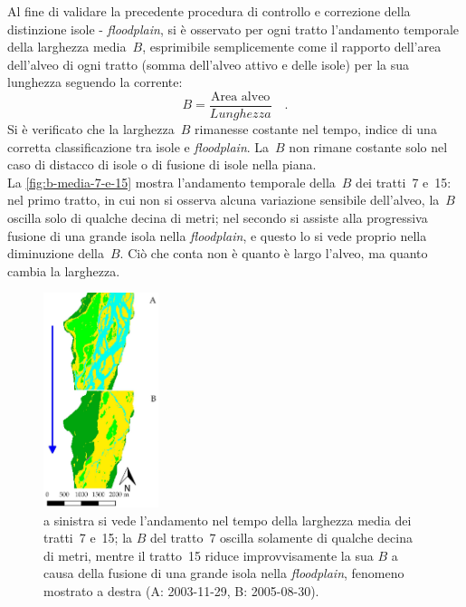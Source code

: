 \begin{description}
Al fine di validare la precedente procedura di controllo e correzione della distinzione isole - \emph{floodplain}, si è osservato per ogni tratto l'andamento temporale della larghezza media~$B$, esprimibile semplicemente come il rapporto dell'area dell'alveo di ogni tratto (somma dell'alveo attivo e delle isole) per la sua lunghezza seguendo la corrente:
	\begin{equation}
		\label{eq:larghezza-tratto}
		B = \frac{\text{Area alveo}}{Lunghezza} 
		\quad .
	\end{equation}
	Si è verificato che la larghezza~$B$ rimanesse costante nel tempo, indice di una corretta classificazione tra isole e \emph{floodplain}. 
	La~$B$ non rimane costante solo nel caso di distacco di isole o di fusione di isole nella piana. 
	\\
	La \vref{fig:b-media-7-e-15} mostra l'andamento temporale della~$B$ dei tratti~7 e~15: nel primo tratto, in cui non si osserva alcuna variazione sensibile dell'alveo, la~$B$ oscilla solo di qualche decina di metri; nel secondo si assiste alla progressiva fusione di una grande isola nella \emph{floodplain}, e questo lo si vede proprio nella diminuzione della~$B$. Ciò che conta non è quanto è largo l'alveo, ma quanto cambia la larghezza.
	\begin{figure}
		\centering
		
		\quad
		\includegraphics[width=0.3\textwidth]{files/fusione_isola_tr_15.jpeg}
		\caption[andamento temporale di $B$ per i tratti~7 e~15]{a sinistra si vede l'andamento nel tempo della larghezza media dei tratti~7 e~15; la $B$ del tratto~7 oscilla solamente di qualche decina di metri, mentre il tratto~15 riduce improvvisamente la sua $B$ a causa della fusione di una grande isola nella \emph{floodplain}, fenomeno mostrato a destra (A: 2003-11-29, B: 2005-08-30).}
		\label{fig:b-media-7-e-15}
	\end{figure}
	
\end{description}


